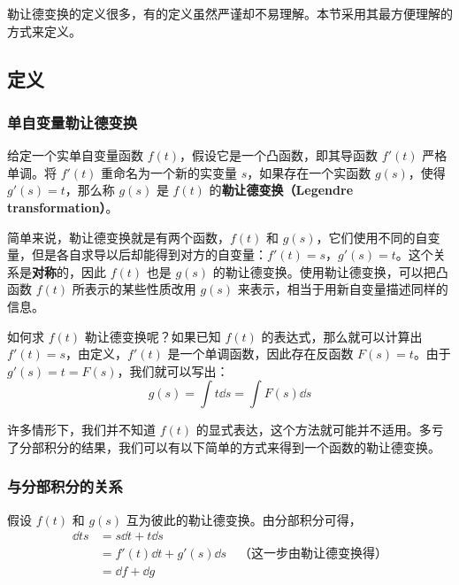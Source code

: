 

勒让德变换的定义很多，有的定义虽然严谨却不易理解。本节采用其最方便理解的方式来定义。

\subsection{定义}

\subsubsection{单自变量勒让德变换}
\begin{definition}{}
给定一个实单自变量函数 $f(t)$，假设它是一个凸函数，即其导函数 $f'(t)$ 严格单调。将 $f'(t)$ 重命名为一个新的实变量 $s$，如果存在一个实函数 $g(s)$，使得 $g'(s)=t$，那么称 $g(s)$ 是 $f(t)$ 的\textbf{勒让德变换（Legendre transformation）}。
\end{definition}

简单来说，勒让德变换就是有两个函数，$f(t)$ 和 $g(s)$，它们使用不同的自变量，但是各自求导以后却能得到对方的自变量：$f'(t)=s$，$g'(s)=t$。这个关系是\textbf{对称}的，因此 $f(t)$ 也是 $g(s)$ 的勒让德变换。使用勒让德变换，可以把凸函数 $f(t)$ 所表示的某些性质改用 $g(s)$ 来表示，相当于用新自变量描述同样的信息。

如何求 $f(t)$ 勒让德变换呢？如果已知 $f(t)$ 的表达式，那么就可以计算出 $f'(t)=s$，由定义，$f'(t)$ 是一个单调函数，因此存在反函数 $F(s)=t$。由于 $g'(s)=t=F(s)$，我们就可以写出：
\begin{equation}
g(s)=\int t \dd{s}=\int F(s) \dd{s}
\end{equation}

许多情形下，我们并不知道 $f(t)$ 的显式表达，这个方法就可能并不适用。多亏了分部积分的结果，我们可以有以下简单的方式来得到一个函数的勒让德变换。


\subsubsection{与分部积分的关系}

假设 $f(t)$ 和 $g(s)$ 互为彼此的勒让德变换。由分部积分可得，
\begin{equation}
\begin{aligned}
\dd{ts}&=s\dd{t}+t\dd{s}\\&=f'(t)\dd{t}+g'(s)\dd{s}\quad\text{（这一步由勒让德变换得）}\\&=\dd{f}+\dd{g}
\end{aligned}
\end{equation}


